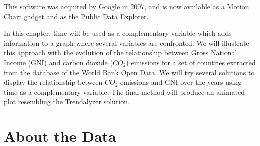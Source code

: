 This software was acquired by Google\textsuperscript{\textregistered}
in 2007, and is now available as a Motion Chart gadget and as the
Public Data Explorer.

In this chapter, time will be used as a complementary variable which
adds information to a graph where several variables are confronted. We
will illustrate this approach with the evolution of the relationship
between Gross National Income (GNI) and carbon dioxide ($CO_2$)
emissions for a set of countries extracted from the database of the
World Bank Open Data. We will try several solutions to display the
relationship between $CO_2$ emissions and GNI over the years using
time as a complementary variable. The final method will produce an
animated plot resembling the Trendalyzer solution.




\chapter{About the Data}
\label{cha:dataTime}




